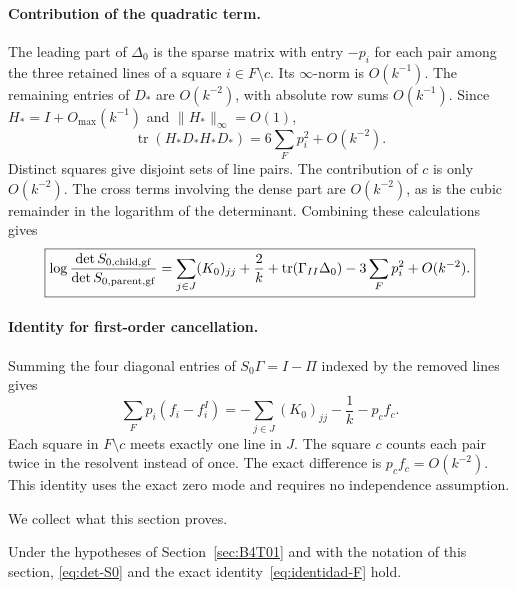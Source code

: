\paragraph{Contribution of the quadratic term.}
The leading part of $\Delta_0$ is the sparse matrix with entry $-p_i$ for each pair among the three retained
lines of a square $i\in F\setminus c$. Its $\infty$-norm is $O(k^{-1})$. The remaining entries of $D_*$ are
$O(k^{-2})$, with absolute row sums $O(k^{-1})$.
Since $H_*=I+O_{\max}(k^{-1})$ and $\|H_*\|_\infty=O(1)$,
\[
 \operatorname{tr}(H_*D_*H_*D_*)=6\sum_Fp_i^2+O(k^{-2}).
\]
Distinct squares give disjoint sets of line pairs. The contribution of $c$ is only $O(k^{-2})$. The cross
terms involving the dense part are $O(k^{-2})$, as is the cubic remainder in the logarithm of the
determinant. Combining these calculations gives
\begin{equation}\label{eq:det-S0}
 \boxed{\log\frac{\det S_{0,\rm child,gf}}{\det S_{0,\rm parent,gf}}
 =\sum_{j\in J}(K_0)_{jj}+\frac2k+
 \operatorname{tr}(\Gamma_{II}\Delta_0)-3\sum_Fp_i^2+O(k^{-2}).}
\end{equation}

\paragraph{Identity for first-order cancellation.}
Summing the four diagonal entries of $S_0\Gamma=I-\Pi$ indexed by the removed lines gives
\begin{equation}\label{eq:identidad-F}
 \boxed{\sum_Fp_i(f_i-f_i^I)
 =-\sum_{j\in J}(K_0)_{jj}-\frac1k-p_cf_c.}
\end{equation}
Each square in $F\setminus c$ meets exactly one line in $J$. The square $c$ counts each pair twice in the
resolvent instead of once. The exact difference is $p_cf_c=O(k^{-2})$.
This identity uses the exact zero mode and requires no independence assumption.

We collect what this section proves.
\begin{lemasub}\label{lem:modocero}
Under the hypotheses of Section~\ref{sec:B4T01} and with the notation of this section,
\eqref{eq:det-S0} and the exact identity~\eqref{eq:identidad-F} hold.
\end{lemasub}
